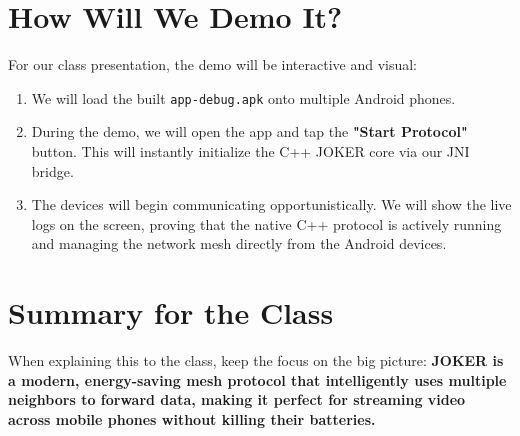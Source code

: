 \documentclass[12pt]{article}
\begin{document}
\section{How Will We Demo It?}
For our class presentation, the demo will be interactive and visual:
\begin{enumerate}
    \item We will load the built \texttt{app-debug.apk} onto multiple Android phones.
    \item During the demo, we will open the app and tap the \textbf{"Start Protocol"} button. This will instantly initialize the C++ JOKER core via our JNI bridge.
    \item The devices will begin communicating opportunistically. We will show the live logs on the screen, proving that the native C++ protocol is actively running and managing the network mesh directly from the Android devices.
\end{enumerate}

\section{Summary for the Class}
When explaining this to the class, keep the focus on the big picture: \textbf{JOKER is a modern, energy-saving mesh protocol that intelligently uses multiple neighbors to forward data, making it perfect for streaming video across mobile phones without killing their batteries.}
\end{document}
